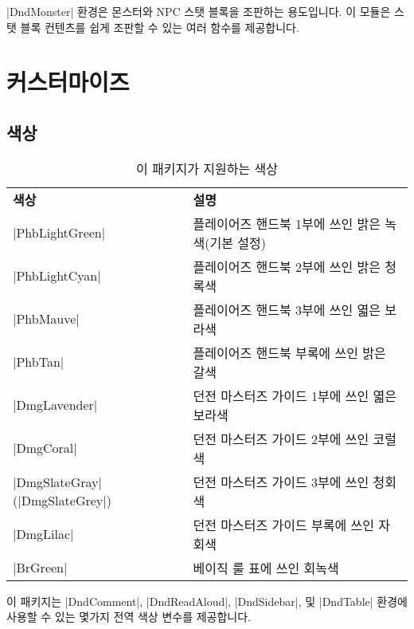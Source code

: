 \documentclass[letterpaper,twocolumn,openany,nodeprecatedcode]{dndbook-ko}
\begin{document}
|DndMonster| 환경은 몬스터와 NPC 스탯 블록을 조판하는 용도입니다. 이 모듈은 스탯 블록 컨텐츠를 쉽게 조판할 수 있는 여러 함수를 제공합니다.

\part{커스터마이즈}

\chapter{색상}

\begin{table*}[b]
  \caption{\DndFontTableTitle{}이 패키지가 지원하는 색상\label{tab:colors}}

  \begin{tabularx}{\linewidth}{lX}
    \textbf{색상}                    & \textbf{설명} \\
    \rowcolor{PhbLightGreen}
    |PhbLightGreen|                 & 플레이어즈 핸드북 1부에 쓰인 밝은 녹색(기본 설정) \\
    \rowcolor{PhbLightCyan}
    |PhbLightCyan|                  & 플레이어즈 핸드북 2부에 쓰인 밝은 청록색 \\
    \rowcolor{PhbMauve}
    |PhbMauve|                      & 플레이어즈 핸드북 3부에 쓰인 엷은 보라색 \\
    \rowcolor{PhbTan}
    |PhbTan|                        & 플레이어즈 핸드북 부록에 쓰인 밝은 갈색 \\
    \rowcolor{DmgLavender}
    |DmgLavender|                   & 던전 마스터즈 가이드 1부에 쓰인 엷은 보라색 \\
    \rowcolor{DmgCoral}
    |DmgCoral|                      & 던전 마스터즈 가이드 2부에 쓰인 코럴색 \\
    \rowcolor{DmgSlateGray}
    |DmgSlateGray| (|DmgSlateGrey|) & 던전 마스터즈 가이드 3부에 쓰인 청회색 \\
    \rowcolor{DmgLilac}
    |DmgLilac|                      & 던전 마스터즈 가이드 부록에 쓰인 자회색 \\
    \rowcolor{BrGreen}
    |BrGreen|                       & 베이직 룰 표에 쓰인 회녹색 \\
  \end{tabularx}
\end{table*}

이 패키지는 |DndComment|, |DndReadAloud|, |DndSidebar|, 및 |DndTable| 환경에 사용할 수 있는 몇가지 전역 색상 변수를 제공합니다.
\end{document}
